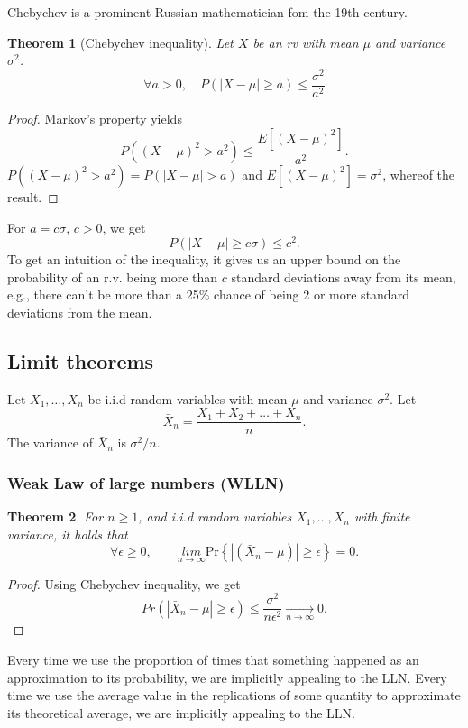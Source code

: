 \documentclass[12pt,a4paper]{article}
\newtheorem{theorem}{Theorem}
\begin{document}
Chebychev is a prominent Russian mathematician fom the 19th century.
\begin{theorem}[Chebychev inequality]
	Let $X$ be an rv with mean $\mu$ and variance $\sigma^2$.
	\begin{equation}
		\forall a>0, \quad P(|X-\mu|\geq a)\leq\frac{\sigma^2}{a^2}
	\end{equation}
\end{theorem}
\begin{proof}
	Markov's property yields 
	$$
		P\left((X-\mu)^2>a^2\right)\leq\frac{E[(X-\mu)^2]}{a^2}.
	$$
	$P\left((X-\mu)^2>a^2\right) = P\left(|X-\mu|>a\right)$ and $E[(X-\mu)^2] = \sigma^2$, whereof the result.
\end{proof}
For $a = c\sigma$,  $c > 0$, we get
$$
P (|X-\mu| \geq c\sigma) \leq c^2.
$$
To get an intuition of the inequality, it gives us an upper bound on the probability of an r.v. being more than $c$
standard deviations away from its mean, e.g., there can't be more than a 25\% chance of being 2 or more standard deviations from the mean.



\subsection{Limit theorems}
Let $X_1,\ldots, X_n$ be i.i.d random variables with mean $\mu$ and variance $\sigma^2$. 
Let 
$$\bar X_n = \frac{X_1+X_2+\ldots+X_n}{n}.$$
The variance of $\bar X_n$ is $\sigma^2/n$. 
\subsubsection{Weak Law of large numbers (WLLN)}
\begin{theorem}
For $n\geq 1$, and i.i.d random variables $X_1,\ldots, X_n$ with finite variance, it holds that
\begin{equation}
\forall \epsilon\geq 0,\qquad \underset{n\rightarrow\infty}{lim}	\text{Pr}\left\{\left|\left(\bar X_n-\mu\right)\right|\geq\epsilon\right\} = 0.
\end{equation}
\end{theorem}

\begin{proof}
	Using Chebychev inequality, we get
	$$
	Pr\left(\left|\bar X_n-\mu\right|\geq \epsilon\right)
	\leq  \frac{\sigma^2}{n\epsilon^2}\underset{n\rightarrow\infty}{\rightarrow}0.
	$$
\end{proof}
Every time we use the proportion of times that something happened as an approximation to its probability, we are implicitly appealing to the LLN. 
Every time we use the average value in the replications of some quantity to approximate its theoretical average, we are implicitly appealing to the LLN.
\end{document}

